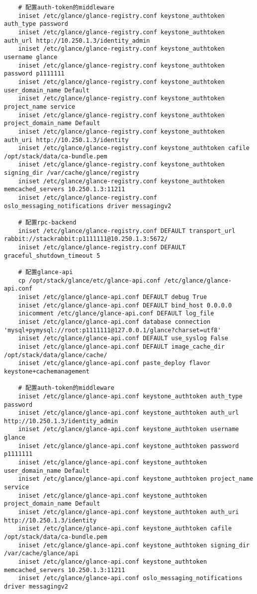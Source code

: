 \documentclass[a4paper,left=1.5cm,right=1.5cm,11pt]{article}
\begin{document}
\begin{lstlisting}
	# 配置auth-token的middleware
	iniset /etc/glance/glance-registry.conf keystone_authtoken auth_type password
    iniset /etc/glance/glance-registry.conf keystone_authtoken auth_url http://10.250.1.3/identity_admin
    iniset /etc/glance/glance-registry.conf keystone_authtoken username glance
    iniset /etc/glance/glance-registry.conf keystone_authtoken password p1111111
    iniset /etc/glance/glance-registry.conf keystone_authtoken user_domain_name Default
    iniset /etc/glance/glance-registry.conf keystone_authtoken project_name service
    iniset /etc/glance/glance-registry.conf keystone_authtoken project_domain_name Default
    iniset /etc/glance/glance-registry.conf keystone_authtoken auth_uri http://10.250.1.3/identity
    iniset /etc/glance/glance-registry.conf keystone_authtoken cafile /opt/stack/data/ca-bundle.pem
    iniset /etc/glance/glance-registry.conf keystone_authtoken signing_dir /var/cache/glance/registry
    iniset /etc/glance/glance-registry.conf keystone_authtoken memcached_servers 10.250.1.3:11211
    iniset /etc/glance/glance-registry.conf oslo_messaging_notifications driver messagingv2
    
	# 配置rpc-backend
	iniset /etc/glance/glance-registry.conf DEFAULT transport_url rabbit://stackrabbit:p1111111@10.250.1.3:5672/
	iniset /etc/glance/glance-registry.conf DEFAULT graceful_shutdown_timeout 5

	# 配置glance-api
    cp /opt/stack/glance/etc/glance-api.conf /etc/glance/glance-api.conf
    iniset /etc/glance/glance-api.conf DEFAULT debug True
    iniset /etc/glance/glance-api.conf DEFAULT bind_host 0.0.0.0
    inicomment /etc/glance/glance-api.conf DEFAULT log_file
    iniset /etc/glance/glance-api.conf database connection 'mysql+pymysql://root:p1111111@127.0.0.1/glance?charset=utf8'
    iniset /etc/glance/glance-api.conf DEFAULT use_syslog False
    iniset /etc/glance/glance-api.conf DEFAULT image_cache_dir /opt/stack/data/glance/cache/
    iniset /etc/glance/glance-api.conf paste_deploy flavor keystone+cachemanagement
	
	# 配置auth-token的middleware
	iniset /etc/glance/glance-api.conf keystone_authtoken auth_type password
    iniset /etc/glance/glance-api.conf keystone_authtoken auth_url http://10.250.1.3/identity_admin
    iniset /etc/glance/glance-api.conf keystone_authtoken username glance
    iniset /etc/glance/glance-api.conf keystone_authtoken password p1111111
    iniset /etc/glance/glance-api.conf keystone_authtoken user_domain_name Default
    iniset /etc/glance/glance-api.conf keystone_authtoken project_name service
    iniset /etc/glance/glance-api.conf keystone_authtoken project_domain_name Default
    iniset /etc/glance/glance-api.conf keystone_authtoken auth_uri http://10.250.1.3/identity
    iniset /etc/glance/glance-api.conf keystone_authtoken cafile /opt/stack/data/ca-bundle.pem
    iniset /etc/glance/glance-api.conf keystone_authtoken signing_dir /var/cache/glance/api
    iniset /etc/glance/glance-api.conf keystone_authtoken memcached_servers 10.250.1.3:11211
    iniset /etc/glance/glance-api.conf oslo_messaging_notifications driver messagingv2
	

\end{lstlisting}
\end{document}
